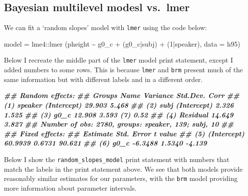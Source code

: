 \documentclass[
]{book}
\newenvironment{Shaded}{\begin{snugshade}}{\end{snugshade}}
\newcommand{\AttributeTok}[1]{\textcolor[rgb]{0.77,0.63,0.00}{#1}}
\newcommand{\DecValTok}[1]{\textcolor[rgb]{0.00,0.00,0.81}{#1}}
\newcommand{\DocumentationTok}[1]{\textcolor[rgb]{0.56,0.35,0.01}{\textbf{\textit{#1}}}}
\newcommand{\FunctionTok}[1]{\textcolor[rgb]{0.00,0.00,0.00}{#1}}
\newcommand{\NormalTok}[1]{#1}
\newcommand{\OtherTok}[1]{\textcolor[rgb]{0.56,0.35,0.01}{#1}}
\newcommand{\SpecialCharTok}[1]{\textcolor[rgb]{0.00,0.00,0.00}{#1}}
\begin{document}
\hypertarget{bayesian-multilevel-modesl-vs.-lmer-3}{%
\subsection{Bayesian multilevel modesl vs.~lmer}\label{bayesian-multilevel-modesl-vs.-lmer-3}}

We can fit a `random slopes' model with \texttt{lmer} using the code below:

\begin{Shaded}
\begin{Highlighting}[]
\NormalTok{model }\OtherTok{=}\NormalTok{ lme4}\SpecialCharTok{::}\FunctionTok{lmer}\NormalTok{ (pheight }\SpecialCharTok{\textasciitilde{}}\NormalTok{ g0\_c }\SpecialCharTok{+}\NormalTok{  (g0\_c}\SpecialCharTok{|}\NormalTok{subj) }\SpecialCharTok{+}\NormalTok{ (}\DecValTok{1}\SpecialCharTok{|}\NormalTok{speaker), }\AttributeTok{data =}\NormalTok{ h95)}
\end{Highlighting}
\end{Shaded}

Below I recreate the middle part of the \texttt{lmer} model print statement, except I added numbers to some rows. This is because \texttt{lmer} and \texttt{brm} present much of the same information but with different labels and in a different order.

\begin{Shaded}
\begin{Highlighting}[]
\DocumentationTok{\#\# Random effects:}
\DocumentationTok{\#\#     Groups   Name        Variance Std.Dev.  Corr}
\DocumentationTok{\#\# (1) speaker  (Intercept) 29.903   5.468        }
\DocumentationTok{\#\# (2) subj     (Intercept)  2.326   1.525        }
\DocumentationTok{\#\# (3)          g0\_c        12.908   3.593  (7) 0.52}
\DocumentationTok{\#\# (4) Residual             14.649   3.827        }
\DocumentationTok{\#\# Number of obs: 2780, groups:  speaker, 139; subj, 10}
\DocumentationTok{\#\# }
\DocumentationTok{\#\# Fixed effects:}
\DocumentationTok{\#\#                Estimate Std. Error t value}
\DocumentationTok{\#\# (5) (Intercept)  60.9939     0.6731  90.621}
\DocumentationTok{\#\# (6) g0\_c         {-}6.3488     1.5340  {-}4.139}
\end{Highlighting}
\end{Shaded}

Below I show the \texttt{random\_slopes\_model} print statement with numbers that match the labels in the print statement above. We see that both models provide reasonably similar estimates for our parameters, with the \texttt{brm} model providing more information about parameter intervals.
\end{document}
